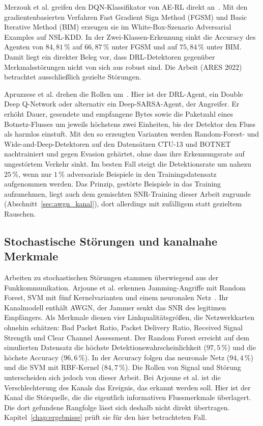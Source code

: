 Merzouk et al. greifen den DQN-Klassifikator von AE-RL direkt an~\autocite{merzoukEvadingDeepReinforcement2022}. Mit den gradientenbasierten Verfahren Fast Gradient Sign Method (FGSM) und Basic Iterative Method (BIM) erzeugen sie im White-Box-Szenario Adversarial Examples auf NSL-KDD. In der Zwei-Klassen-Erkennung sinkt die Accuracy des Agenten von $84{,}81\,\%$ auf $66{,}87\,\%$ unter FGSM und auf $75{,}84\,\%$ unter BIM. Damit liegt ein direkter Beleg vor, dass DRL-Detektoren gegenüber Merkmalsstörungen nicht von sich aus robust sind. Die Arbeit (ARES 2022) betrachtet ausschließlich gezielte Störungen.

Apruzzese et al. drehen die Rollen um~\autocite{apruzzeseDeepReinforcementAdversarial2020}. Hier ist der DRL-Agent, ein Double Deep Q-Network oder alternativ ein Deep-SARSA-Agent, der Angreifer. Er erhöht Dauer, gesendete und empfangene Bytes sowie die Paketzahl eines Botnetz-Flusses um jeweils höchstens zwei Einheiten, bis der Detektor den Fluss als harmlos einstuft. Mit den so erzeugten Varianten werden Random-Forest- und Wide-and-Deep-Detektoren auf den Datensätzen CTU-13 und BOTNET nachtrainiert und gegen Evasion gehärtet, ohne dass ihre Erkennungsrate auf ungestörtem Verkehr sinkt. Im besten Fall steigt die Detektionsrate um nahezu $25\,\%$, wenn nur $1\,\%$ adversariale Beispiele in den Trainingsdatensatz aufgenommen werden. Das Prinzip, gestörte Beispiele in das Training aufzunehmen, liegt auch dem gemischten SNR-Training dieser Arbeit zugrunde (Abschnitt~\ref{sec:awgn_kanal}), dort allerdings mit zufälligem statt gezieltem Rauschen.

\subsection{Stochastische Störungen und kanalnahe Merkmale}

Arbeiten zu stochastischen Störungen stammen überwiegend aus der Funkkommunikation. Arjoune et al. erkennen Jamming-Angriffe mit Random Forest, SVM mit fünf Kernelvarianten und einem neuronalen Netz~\autocite{arjouneNovelJammingAttacks2020}. Ihr Kanalmodell enthält AWGN, der Jammer senkt das SNR des legitimen Empfängers. Als Merkmale dienen vier Linkqualitätsgrößen, die Netzwerkkarten ohnehin schätzen: Bad Packet Ratio, Packet Delivery Ratio, Received Signal Strength und Clear Channel Assessment. Der Random Forest erreicht auf dem simulierten Datensatz die höchste Detektionswahrscheinlichkeit ($97{,}5\,\%$) und die höchste Accuracy ($96{,}6\,\%$). In der Accuracy folgen das neuronale Netz ($94{,}4\,\%$) und die SVM mit RBF-Kernel ($84{,}7\,\%$). Die Rollen von Signal und Störung unterscheiden sich jedoch von dieser Arbeit. Bei Arjoune et al. ist die Verschlechterung des Kanals das Ereignis, das erkannt werden soll. Hier ist der Kanal die Störquelle, die die eigentlich informativen Flussmerkmale überlagert. Die dort gefundene Rangfolge lässt sich deshalb nicht direkt übertragen. Kapitel~\ref{chap:ergebnisse} prüft sie für den hier betrachteten Fall.

